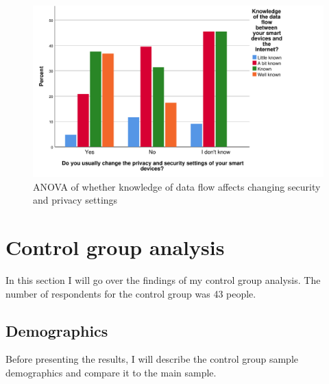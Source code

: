\begin{figure}[!h]
    \centering
    \includegraphics[scale=0.55]{figures/diagrams/changesettings_dataflow.pdf}
    \caption{ANOVA of whether knowledge of data flow affects changing security and privacy settings}
    \label{fig:changesetting_dataflow}
\end{figure}

\section{Control group analysis}
In this section I will go over the findings of my control group analysis. The number of respondents for the control group was 43 people. 

\subsection{Demographics}
Before presenting the results, I will describe the control group sample demographics and compare it to the main sample. 

